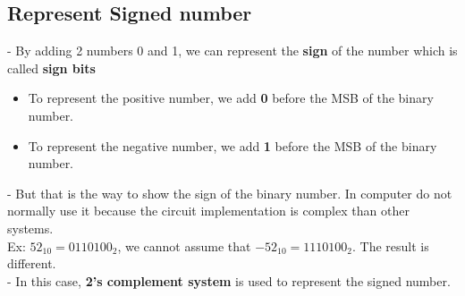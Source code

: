 \documentclass[12pt]{article}
\begin{document}
\subsection{Represent Signed number}
- By adding 2 numbers 0 and 1, we can represent the \textbf{sign} of the number which is called \textbf{sign bits}
\begin{itemize}
	\item To represent the positive number, we add \textbf{0} before the MSB of the binary number.
	\item To represent the negative number, we add \textbf{1} before the MSB of the binary number.
\end{itemize}
- But that is the way to show the sign of the binary number. In computer do not normally use it because the circuit implementation is complex than other systems. \\
Ex: $52_{10} = 0110100_{2}$, we cannot assume that $ - 52_{10} = 1110100_{2}$. The result is different. \\
- In this case, \textbf{2's complement system} is used to represent the signed number.
\end{document}
